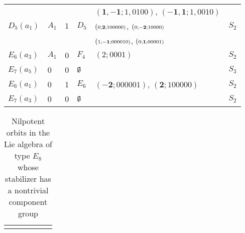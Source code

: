 \documentclass[a4paper,10pt]{amsart}
\newcommand{\mf}{\mathfrak}
\newcommand{\g}{\mf{g}}
\newcommand{\wtt}[3]{{\small (\scriptstyle{#1};\scriptstyle{\mathbf{#2}};\scriptstyle{#3})}}
\newcommand{\wts}[2]{{({\scriptstyle{#1}};{\scriptstyle{#2}})}}
\numberwithin{equation}{section}
\theoremstyle{remark}
\theoremstyle{remark}
\begin{document}
\begin{longtable}{|l|l|l|l|l|l|}
& & & &  $\wts{{\mathbf{1,-1}}}{1,0100}$,  $\wts{{\mathbf{-1,1}}}{1,0010}$ &\\
$D_5(a_1)$ & $A_1$ & $1$ & $D_5$ & $\wtt{0}{2}{100000}$, $\wtt{0}{-2}{10000}$ &
$S_2$ \\
& & & & $\wtt{1}{-1}{000010}$, $\wtt{0}{1}{00001}$ & \\
$E_6(a_3)$ & $A_1$ & 0 & $F_4$ & $\wts{2}{0001}$ & $S_2$ \\
$E_7(a_5)$ & 0 & 0 & $\g$ & & $S_3$\\
$E_6(a_1)$ & 0 & 1 & $E_6$ & $\wts{\mathbf{-2}}{000001}$,
$\wts{\mathbf{2}}{100000}$ & $S_2$\\
$E_7(a_3)$ & 0 & 0 & $\g$ & & $S_2$ \\
\hline  
\end{longtable}

\begin{longtable}{|l|l|l|l|l|l|}
\caption{Nilpotent orbits in the Lie algebra of type $E_8$ whose stabilizer
  has a nontrivial component group}\label{tab:E8} 
\endfirsthead
\hline
\endhead
\hline
\endfoot
\endlastfoot


\end{longtable}
\end{document}
